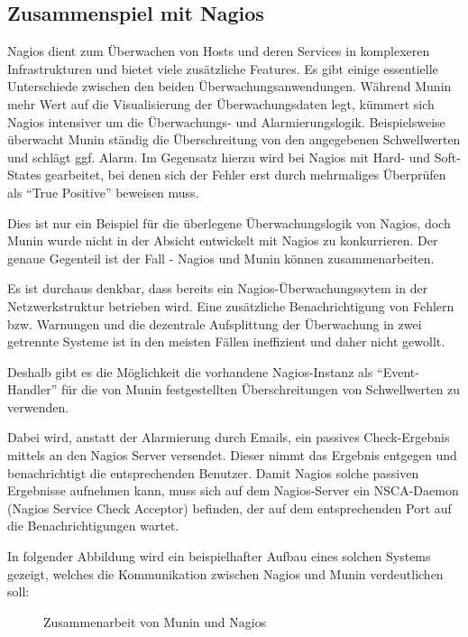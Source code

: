 \subsection{Zusammenspiel mit Nagios}

Nagios dient zum Überwachen von Hosts und deren Services in komplexeren Infrastrukturen und bietet viele zusätzliche Features.
Es gibt einige essentielle Unterschiede zwischen den beiden Überwachungsanwendungen.
Während Munin mehr Wert auf die Visualisierung der Überwachungsdaten legt, kümmert sich Nagios intensiver um die Überwachungs- und Alarmierungslogik.
Beispielsweise überwacht Munin ständig die Überschreitung von den angegebenen Schwellwerten und schlägt ggf. Alarm.
Im Gegensatz hierzu wird bei Nagios mit Hard- und Soft-States gearbeitet, bei denen sich der Fehler erst durch mehrmaliges Überprüfen als "`True Positive"' beweisen muss.

Dies ist nur ein Beispiel für die überlegene Überwachungslogik von Nagios, doch Munin wurde nicht in der Absicht entwickelt mit Nagios zu konkurrieren.
Der genaue Gegenteil ist der Fall - Nagios und Munin können zusammenarbeiten.

Es ist durchaus denkbar, dass bereits ein Nagios-Überwachungssytem in der Netzwerkstruktur betrieben wird.
Eine zusätzliche Benachrichtigung von Fehlern bzw. Warnungen und die dezentrale Aufsplittung der Überwachung in zwei getrennte Systeme ist in den meisten Fällen ineffizient und daher nicht gewollt.

Deshalb gibt es die Möglichkeit die vorhandene Nagios-Instanz als "`Event-Handler"' für die von Munin festgestellten Überschreitungen von Schwellwerten zu verwenden.

Dabei wird, anstatt der Alarmierung durch Emails, ein passives Check-Ergebnis mittels  an den Nagios Server versendet.
Dieser nimmt das Ergebnis entgegen und benachrichtigt die entsprechenden Benutzer.
Damit Nagios solche passiven Ergebnisse aufnehmen kann, muss sich auf dem Nagios-Server ein NSCA-Daemon (Nagios Service Check Acceptor) befinden, der auf dem entsprechenden Port auf die Benachrichtigungen wartet.

In folgender Abbildung wird ein beispielhafter Aufbau eines solchen Systems gezeigt, welches die Kommunikation zwischen Nagios und Munin verdeutlichen soll:

\begin{figure}[ht]
	\centering
		\caption{Zusammenarbeit von Munin und Nagios}
		\label{nsca}
\end{figure}

